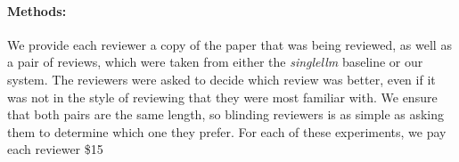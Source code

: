 \documentclass{article} %
\begin{document}
\paragraph{Methods:}
We provide each reviewer a copy of the paper that was being reviewed, as well as a pair of reviews, which were taken from either the \textit{singlellm} baseline or our system. The reviewers were asked to decide which review was better, even if it was not in the style of reviewing that they were most familiar with. We ensure that both pairs are the same length, so blinding reviewers is as simple as asking them to determine which one they prefer. For each of these experiments, we pay each reviewer \$15 
\begin{table}[t]
\centering
\caption{Comparison between opinion-based and review-quality scores for \textit{singlellm} vs.\ AAE+CGR review processes.}
\begin{minipage}[t]{0.48\textwidth}
\centering
{}
\end{minipage}
\hfill
\begin{minipage}[t]{0.48\textwidth}
\centering
{}
\end{minipage}
\label{tab:reviewer-opinions}
\end{table}
\end{document}

